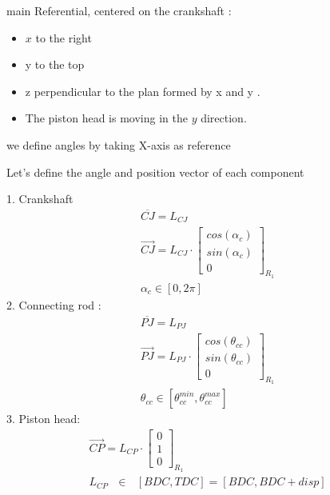 \documentclass[12pt,a4paper]{article}
\begin{document}
	main Referential, centered on the crankshaft :\\
	
	\begin{itemize}
		\item $x$ to the right
		\item y to the top
		\item z perpendicular to the plan formed by x and y .
		\item The piston head is moving in the $y$ direction.
	\end{itemize}
	
	we define angles by taking X-axis as reference
	
	Let's define the angle and position vector of each component
	

	1. Crankshaft
	\begin{eqnarray}
		\overline{CJ} = L_{CJ}\\
		\vec{CJ} = L_{CJ} \cdot 
		\begin{bmatrix}
			cos(\alpha_{c}) \\
			sin(\alpha_{c})\\
			0
		\end{bmatrix}_{R_{1}} \\
		\alpha_{c} \in [0, 2 \pi] 
	\end{eqnarray} 
	2. Connecting rod : 
	\begin{eqnarray}
		\overline{PJ} = L_{PJ}\\
		\vec{PJ} = L_{PJ} \cdot  
			\begin{bmatrix}
			cos(\theta_{cc}) \\
			sin(\theta_{cc}) \\
			0
		\end{bmatrix}_{R_{1}} \\
		\theta_{cc} \in [\theta_{cc}^{min}, \theta_{cc}^{max}]
	\end{eqnarray}
	3. Piston head: 
	\begin{eqnarray}
	\vec{CP} = L_{CP} \cdot  
	\begin{bmatrix}
		0 \\
		1 \\
		0
	\end{bmatrix}_{R_{1}} \\
	L_{CP} \text{ $\in$ } [BDC, TDC] = [BDC, BDC + disp]
	\end{eqnarray}
\end{document}
